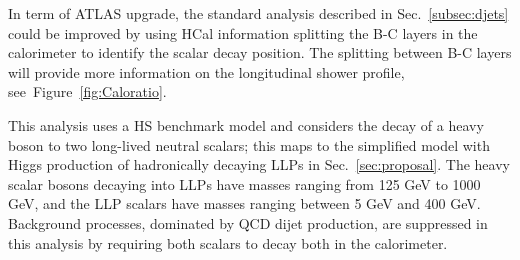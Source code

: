 In term of ATLAS upgrade, the standard analysis described in Sec.~\ref{subsec:djets} could be improved by using  HCal information splitting the B-C layers in the calorimeter to identify the scalar decay position.
The splitting between B-C layers will provide more information on the longitudinal shower profile, see~Figure~\ref{fig:Caloratio}.


This analysis uses a HS benchmark model and considers the decay of a heavy boson to two long-lived neutral scalars; this maps to the simplified model with Higgs production of hadronically decaying LLPs in Sec.~\ref{sec:proposal}. The heavy scalar bosons decaying into LLPs have masses ranging from 125 GeV to 1000 GeV, and the LLP scalars have masses ranging between 5 GeV and 400 GeV.
Background processes, dominated by QCD dijet production, are suppressed in this analysis by requiring both scalars to decay both in the calorimeter.

